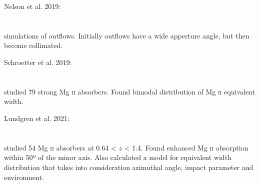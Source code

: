 \hline

Nelson et al. 2019: \\
\citet{2019MNRAS.490.3234N} \\
\citep{2019MNRAS.490.3234N} \\
simulations of outflows. Initially outflows have a wide apperture angle, but
then become collimated. \\

\hline

Schroetter et al. 2019: \\
\citet{2019MNRAS.490.4368S} \\
\citep{2019MNRAS.490.4368S} \\
studied 79 strong Mg \textsc{ii} absorbers. Found bimodal distribution of
Mg \textsc{ii} equivalent width. \\

\hline

Lundgren et al. 2021: \\
\citet{2021ApJ...913...50L} \\
\citep{2021ApJ...913...50L} \\
studied 54 Mg \textsc{ii} absorbers at 0.64 < $z$ < 1.4. Found enhanced
Mg \textsc{ii} absorption within 50º of the minor axis. Also calculated a model
for equivalent width distribution that takes into consideration azimuthal angle,
impact parameter and environment.

